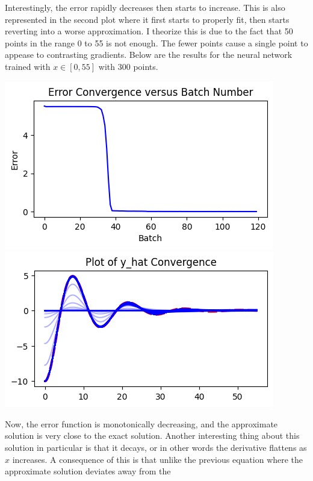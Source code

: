 \documentclass[12pt]{article}
\begin{document}
\begin{description}
\begin{minipage}{\linewidth}
    \end{minipage}
    Interestingly, the error rapidly decreases then starts to increase. This is
    also represented in the second plot where it first starts to properly fit,
    then starts reverting into a worse approximation. I theorize this is due to
    the fact that 50 points in the range 0 to 55 is not enough. The fewer
    points cause a single point to appease to contrasting gradients. Below are
    the results for the neural network trained with $x\in[0, 55]$ with $300$
    points. \\
    \begin{minipage}{\linewidth}
        \centering
        \includegraphics[scale=.5]{images/figure15.png}
        \includegraphics[scale=.5]{images/figure16.png}
    \end{minipage}
    Now, the error function is monotonically decreasing, and the approximate
    solution is very close to the exact solution. Another interesting thing
    about this solution in particular is that it decays, or in other words the
    derivative flattens as $x$ increases. A consequence of this is that unlike
    the previous equation where the approximate solution deviates away from the

\end{description}
\end{document}
